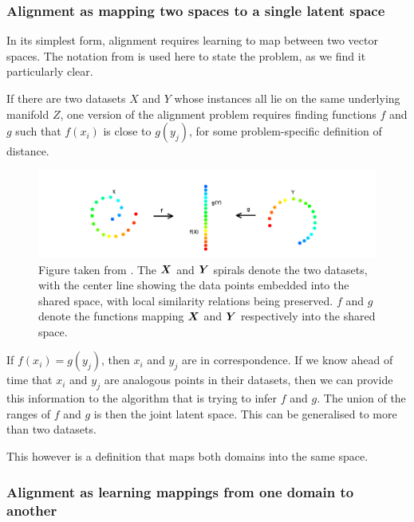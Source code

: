 \subsubsection{Alignment as mapping two spaces to a single latent space}
In its simplest form, alignment requires learning to map between two vector spaces. The notation from \cite{ManifoldLearningTheoryAndApplications} is used here to state the problem, as we find it particularly clear.

If there are two datasets $X$ and $Y$ whose instances all lie on the same underlying manifold $Z$, one version of the alignment problem requires finding functions $f$ and $g$ such that $f(x_i)$ is close  to $g(y_j)$, for some problem-specific definition of distance.

\begin{figure}[H]
    \centering
    \includegraphics[width=\textwidth]{images/review/alignment.png}
    \caption{
        Figure taken from \cite{ManifoldLearningTheoryAndApplications}. The $\boldsymbol{X}$ and $\boldsymbol{Y}$ spirals denote the two datasets, with the center line showing the data points embedded into the shared space, with local similarity relations being preserved. $f$ and $g$ denote the functions mapping $\boldsymbol{X}$ and $\boldsymbol{Y}$ respectively into the shared space. 
    }
\end{figure}

If $f(x_i) = g(y_j)$, then $x_i$ and $y_j$ are in correspondence. If we know ahead of time that $x_i$ and $y_j$ are analogous points in their datasets, then we can provide this information to the algorithm that is trying to infer $f$ and $g$. The union of the ranges of $f$ and $g$ is then the joint latent space. This can be generalised to more than two datasets. 

This however is a definition that maps both domains into the same space. 

\newpage
\subsubsection{Alignment as learning mappings from one domain to another}

